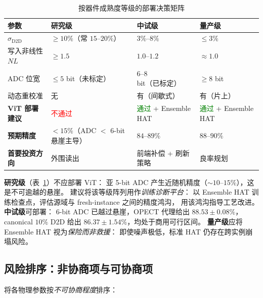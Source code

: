 \begin{table}[t]
\centering
\caption{按器件成熟度等级的部署决策矩阵}
\label{tab:maturity-matrix}
\small
\begin{tabular}{@{}llll@{}}
\toprule
\textbf{参数} & \textbf{研究级} & \textbf{中试级} & \textbf{量产级} \\
\midrule
$\sigma_{\mathrm{D2D}}$ & $\ge 10\%$（常 $15$--$20\%$） & $3\%$--$8\%$ & $\le 3\%$ \\
写入非线性 $NL$ & $\ge 1.5$ & $1.0$--$1.2$ & $\approx 1.0$ \\
ADC 位宽 & $\le 5$ bit（未标定） & $6$--$8$ bit（已标定） & $\ge 8$ bit \\
动态重校准 & 无 & 有（间歇式） & 有（片上） \\
\midrule
\textbf{ViT 部署建议} & \textcolor{red}{不通过} & \textcolor{green}{通过} + Ensemble HAT & \textcolor{green}{通过} + Ensemble HAT \\
\textbf{预期精度} & $<15\%$（ADC $<$ 6-bit 悬崖主导） & $84$--$89\%$ & $88$--$90\%$ \\
\textbf{首要投资方向} & 外围读出 & 前端补偿 + 刷新策略 & 良率规划 \\
\bottomrule
\end{tabular}
\end{table}

\textbf{研究级}（表~\ref{tab:maturity-matrix}）不应部署 ViT：
亚 5-bit ADC 产生近随机精度（$\sim$$10$--$15\%$），这是不可逾越的悬崖。
建议将该等级阵列用作\emph{训练诊断平台}：
以 Ensemble HAT 训练检查点，评估源域与 fresh-instance 之间的精度鸿沟，
用该鸿沟指导工艺改进。
\textbf{中试级}可部署：
6-bit ADC 已越过悬崖，OPECT 代理给出 $88.53\pm0.08\%$，
canonical $10\%$ D2D 给出 $86.37\pm1.54\%$，均处于商用可行区间。
\textbf{量产级}应将 Ensemble HAT 视为\emph{保险而非救援}：
即使噪声极低，标准 HAT 仍存在跨实例崩塌风险。

\subsection{风险排序：非协商项与可协商项}

将各物理参数按\emph{不可协商程度}排序：


